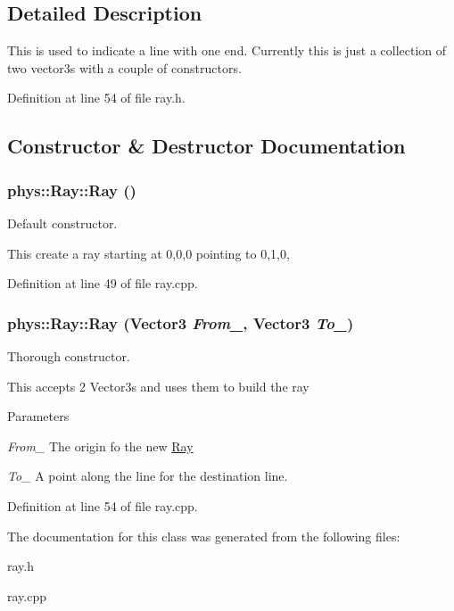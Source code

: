 \subsection{Detailed Description}
This is used to indicate a line with one end. Currently this is just a collection of two vector3s with a couple of constructors. 

Definition at line 54 of file ray.h.



\subsection{Constructor \& Destructor Documentation}
\hypertarget{classphys_1_1Ray_a35f4f5eec653ea561353163eaad672d3}{
\subsubsection[{Ray}]{\setlength{\rightskip}{0pt plus 5cm}phys::Ray::Ray ()}}
\label{df/d57/classphys_1_1Ray_a35f4f5eec653ea561353163eaad672d3}


Default constructor. 

This create a ray starting at 0,0,0 pointing to 0,1,0, 

Definition at line 49 of file ray.cpp.

\hypertarget{classphys_1_1Ray_aa6123ef37a2351e6cca3954c23212379}{
\subsubsection[{Ray}]{\setlength{\rightskip}{0pt plus 5cm}phys::Ray::Ray ({\bf Vector3} {\em From\_\-}, \/  {\bf Vector3} {\em To\_\-})}}
\label{df/d57/classphys_1_1Ray_aa6123ef37a2351e6cca3954c23212379}


Thorough constructor. 

This accepts 2 Vector3s and uses them to build the ray 
\begin{DoxyParams}{Parameters}
\item[{\em From\_\-}]The origin fo the new \hyperlink{classphys_1_1Ray}{Ray} \item[{\em To\_\-}]A point along the line for the destination line. \end{DoxyParams}


Definition at line 54 of file ray.cpp.



The documentation for this class was generated from the following files:\begin{DoxyCompactItemize}
\item 
ray.h\item 
ray.cpp\end{DoxyCompactItemize}
